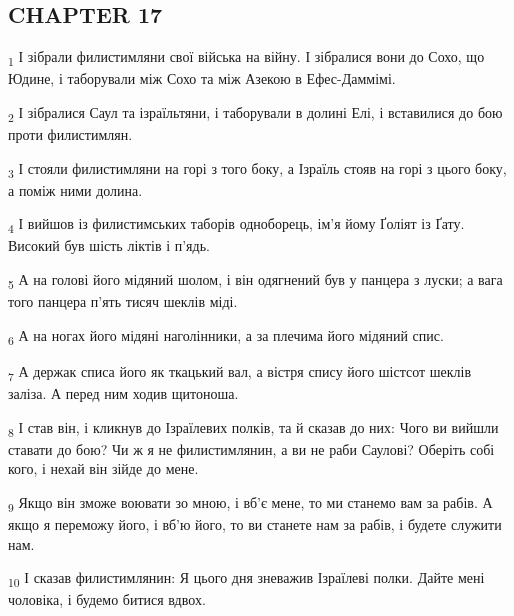 \subsection{CHAPTER 17}
\begin{tcolorbox}
\textsubscript{1} І зібрали филистимляни свої війська на війну. І зібралися вони до Сохо, що Юдине, і таборували між Сохо та між Азекою в Ефес-Даммімі.
\end{tcolorbox}
\begin{tcolorbox}
\textsubscript{2} І зібралися Саул та ізраїльтяни, і таборували в долині Елі, і вставилися до бою проти филистимлян.
\end{tcolorbox}
\begin{tcolorbox}
\textsubscript{3} І стояли филистимляни на горі з того боку, а Ізраїль стояв на горі з цього боку, а поміж ними долина.
\end{tcolorbox}
\begin{tcolorbox}
\textsubscript{4} І вийшов із филистимських таборів одноборець, ім'я йому Ґоліят із Ґату. Високий був шість ліктів і п'ядь.
\end{tcolorbox}
\begin{tcolorbox}
\textsubscript{5} А на голові його мідяний шолом, і він одягнений був у панцера з луски; а вага того панцера п'ять тисяч шеклів міді.
\end{tcolorbox}
\begin{tcolorbox}
\textsubscript{6} А на ногах його мідяні наголінники, а за плечима його мідяний спис.
\end{tcolorbox}
\begin{tcolorbox}
\textsubscript{7} А держак списа його як ткацький вал, а вістря спису його шістсот шеклів заліза. А перед ним ходив щитоноша.
\end{tcolorbox}
\begin{tcolorbox}
\textsubscript{8} І став він, і кликнув до Ізраїлевих полків, та й сказав до них: Чого ви вийшли ставати до бою? Чи ж я не филистимлянин, а ви не раби Саулові? Оберіть собі кого, і нехай він зійде до мене.
\end{tcolorbox}
\begin{tcolorbox}
\textsubscript{9} Якщо він зможе воювати зо мною, і вб'є мене, то ми станемо вам за рабів. А якщо я переможу його, і вб'ю його, то ви станете нам за рабів, і будете служити нам.
\end{tcolorbox}
\begin{tcolorbox}
\textsubscript{10} І сказав филистимлянин: Я цього дня зневажив Ізраїлеві полки. Дайте мені чоловіка, і будемо битися вдвох.
\end{tcolorbox}
